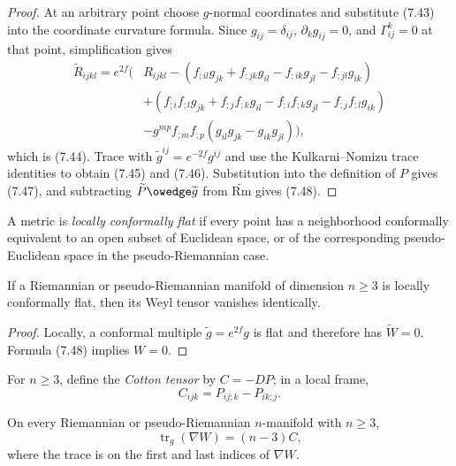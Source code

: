 \begin{proof}
\sketch
At an arbitrary point choose $g$-normal coordinates and substitute (7.43)
into the coordinate curvature formula.  Since
$g_{ij}=\delta_{ij}$, $\partial_kg_{ij}=0$, and $\Gamma^k_{ij}=0$ at that
point, simplification gives
\begin{align*}
\widetilde R_{ijkl}=e^{2f}\bigl(&R_{ijkl}
-(f_{;il}g_{jk}+f_{;jk}g_{il}-f_{;ik}g_{jl}-f_{;jl}g_{ik})\\
&+(f_{;i}f_{;l}g_{jk}+f_{;j}f_{;k}g_{il}
-f_{;i}f_{;k}g_{jl}-f_{;j}f_{;l}g_{ik})\\
&-g^{mp}f_{;m}f_{;p}(g_{il}g_{jk}-g_{ik}g_{jl})\bigr),
\end{align*}
which is (7.44).  Trace with
$\widetilde g^{ij}=e^{-2f}g^{ij}$ and use the Kulkarni--Nomizu trace
identities to obtain (7.45) and (7.46).  Substitution into the definition of
$P$ gives (7.47), and subtracting
$\widetilde P\owedge\widetilde g$ from $\widetilde{\mathrm{Rm}}$ gives (7.48).
\end{proof}

A metric is \emph{locally conformally flat} if every point has a neighborhood
conformally equivalent to an open subset of Euclidean space, or of the
corresponding pseudo-Euclidean space in the pseudo-Riemannian case.

\begin{corollary}
\label{cor:weyl-zero-locally-conformally-flat}
If a Riemannian or pseudo-Riemannian manifold of dimension $n\geq3$ is locally
conformally flat, then its Weyl tensor vanishes identically.
\end{corollary}

\begin{proof}
\sketch
Locally, a conformal multiple $\widetilde g=e^{2f}g$ is flat and therefore has
$\widetilde W=0$.  Formula (7.48) implies $W=0$.
\end{proof}

For $n\geq3$, define the \emph{Cotton tensor} by $C=-DP$; in a local frame,
\begin{equation}
C_{ijk}=P_{ij;k}-P_{ik;j}. \tag{7.49}
\end{equation}

\begin{proposition}
\label{prop:trace-covariant-derivative-weyl}
On every Riemannian or pseudo-Riemannian $n$-manifold with $n\geq3$,
\begin{equation}
\operatorname{tr}_g(\nabla W)=(n-3)C, \tag{7.50}
\end{equation}
where the trace is on the first and last indices of $\nabla W$.
\end{proposition}

